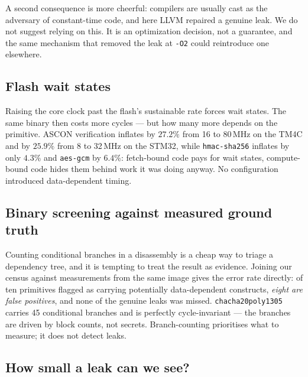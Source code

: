 \documentclass[11pt,a4paper]{article}
\begin{document}
A second consequence is more cheerful: compilers are usually cast as the
adversary of constant-time code, and here LLVM repaired a genuine leak. We do
not suggest relying on this. It is an optimization decision, not a guarantee,
and the same mechanism that removed the leak at \texttt{-O2} could reintroduce
one elsewhere.

\subsection{Flash wait states}
\label{sec:clock}

Raising the core clock past the flash's sustainable rate forces wait states.
The same binary then costs more cycles --- but how many more depends on the
primitive. ASCON verification inflates by $27.2\%$ from 16 to 80\,MHz on the
TM4C and by $25.9\%$ from 8 to 32\,MHz on the STM32, while
\texttt{hmac-sha256} inflates by only $4.3\%$ and \texttt{aes-gcm} by $6.4\%$:
fetch-bound code pays for wait states, compute-bound code hides them behind
work it was doing anyway. No configuration introduced data-dependent timing.

\subsection{Binary screening against measured ground truth}
\label{sec:static}

Counting conditional branches in a disassembly is a cheap way to triage a
dependency tree, and it is tempting to treat the result as evidence. Joining our
census against measurements from the same image gives the error rate directly:
of ten primitives flagged as carrying potentially data-dependent constructs,
\emph{eight are false positives}, and none of the genuine leaks was missed.
\texttt{chacha20poly1305} carries 45 conditional branches and is perfectly
cycle-invariant --- the branches are driven by block counts, not secrets.
Branch-counting prioritises what to measure; it does not detect leaks.

\subsection{How small a leak can we see?}
\label{sec:floor}
\end{document}
